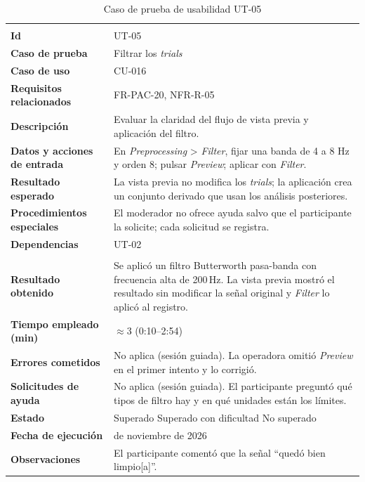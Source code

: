 \documentclass[12pt,letterpaper,oneside]{article}
\DeclareRobustCommand{\_}{\textunderscore\allowbreak}
\newcommand{\fechasesion}{12 de noviembre de 2026}
\newcommand{\casilla}[1]{%
    \fbox{\makebox[1em][c]{#1}}%
}
\begin{document}
\begin{center}
\small
\begin{longtable}{|>{\raggedright\arraybackslash}p{}|>{\raggedright\arraybackslash}p{}|}
\hline
\endfirsthead
\hline
\endhead
\hline
\endfoot
\hline
\caption{Caso de prueba de usabilidad UT-05} \label{tab:ut-05} \\
\endlastfoot
\textbf{Id} & UT-05 \\
\hline
\textbf{Caso de prueba} & Filtrar los \textit{trials} \\
\hline
\textbf{Caso de uso} & CU-016 \\
\hline
\textbf{Requisitos relacionados} & FR-PAC-20, NFR-R-05 \\
\hline
\textbf{Descripción} & Evaluar la claridad del flujo de vista previa y aplicación del filtro. \\
\hline
\textbf{Datos y acciones de entrada} & En \textit{Preprocessing} > \textit{Filter}, fijar una banda de 4 a 8 Hz y orden 8; pulsar \textit{Preview}; aplicar con \textit{Filter}. \\
\hline
\textbf{Resultado esperado} & La vista previa no modifica los \textit{trials}; la aplicación crea un conjunto derivado que usan los análisis posteriores. \\
\hline
\textbf{Procedimientos especiales} & El moderador no ofrece ayuda salvo que el participante la solicite; cada solicitud se registra. \\
\hline
\textbf{Dependencias} & UT-02 \\
\hline
\multicolumn{2}{|c|}{\textbf{Información para el seguimiento}} \\
\hline
\textbf{Resultado obtenido} & Se aplicó un filtro Butterworth pasa-banda con frecuencia alta de 200\,Hz. La vista previa mostró el resultado sin modificar la señal original y \textit{Filter} lo aplicó al registro. \\
\hline
\textbf{Tiempo empleado (min)} & $\approx$3 (0:10--2:54) \\
\hline
\textbf{Errores cometidos} & No aplica (sesión guiada). La operadora omitió \textit{Preview} en el primer intento y lo corrigió. \\
\hline
\textbf{Solicitudes de ayuda} & No aplica (sesión guiada). El participante preguntó qué tipos de filtro hay y en qué unidades están los límites. \\
\hline
\textbf{Estado} & \casilla{x} Superado \qquad \casilla{} Superado con dificultad \qquad \casilla{} No superado \\
\hline
\textbf{Fecha de ejecución} & \fechasesion \\
\hline
\textbf{Observaciones} & El participante comentó que la señal ``quedó bien limpio[a]''. \\
\hline
\end{longtable}
\end{center}
\end{document}
